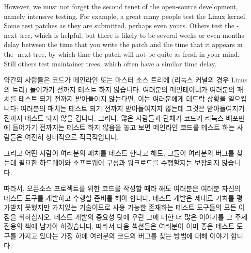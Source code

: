 However, we must not forget the second tenet of the open-source development,
namely intensive testing.
For example, a great many people test the Linux kernel.
Some test patches as they are submitted, perhaps even yours.
Others test the -next tree, which is helpful, but there is likely to be
several weeks or even months delay between the time that you write the
patch and the time that it appears in the -next tree, by which time the
patch will not be quite as fresh in your mind.
Still others test maintainer trees, which often have a similar time delay.

\fi

약간의 사람들은 코드가 메인라인 또는 마스터 소스 트리에 (리눅스 커널의 경우
Linus 의 트리) 들어가기 전까지 테스트 하지 않습니다.
여러분의 메인테이너가 여러분의 패치를 테스트 되기 전까지 받아들이지 않는다면,
이는 여러분에게 데드락 상황을 일으킵니다: 여러분의 패치는 테스트 되기 전까지
받아들여지지 않는데 그것은 받아들여지기 전까지 테스트 되지 않을 겁니다.
그러나, 많은 사람들과 단체가 코드가 리눅스 배포판에 들어가기 전까지는 테스트
하지 않음을 놓고 보면 메인라인 코드를 테스트 하는 사람들은 여전히 상대적으로
적극적입니다.

그리고 어떤 사람이 여러분의 패치를 테스트 한다고 해도, 그들이 여러분의 버그를
찾는데 필요한 하드웨어와 소프트웨어 구성과 워크로드를 수행할지는 보장되지
않습니다.

따라서, 오픈소스 프로젝트를 위한 코드를 작성할 때라 해도 여러분은 여러분 자신의
테스트 도구를 개발하고 수행할 준비를 해야 합니다.
테스트 개발은 제대로 가치를 평가받지 못했지만 가치있는 기술이므로 사용 가능한
존재하는 테스트 도구들의 모든 이점을 취하십시오.
테스트 개발의 중요성 탓에 우린 그에 대한 더 많은 이야기를 그 주제 전용의 책에
남겨야 하겠습니다.
따라서 다음 섹션들은 여러분이 이미 좋은 테스트 도구를 가지고 있다는 가정 하에
여러분의 코드의 버그를 찾는 방법에 대해 이야기 합니다.


